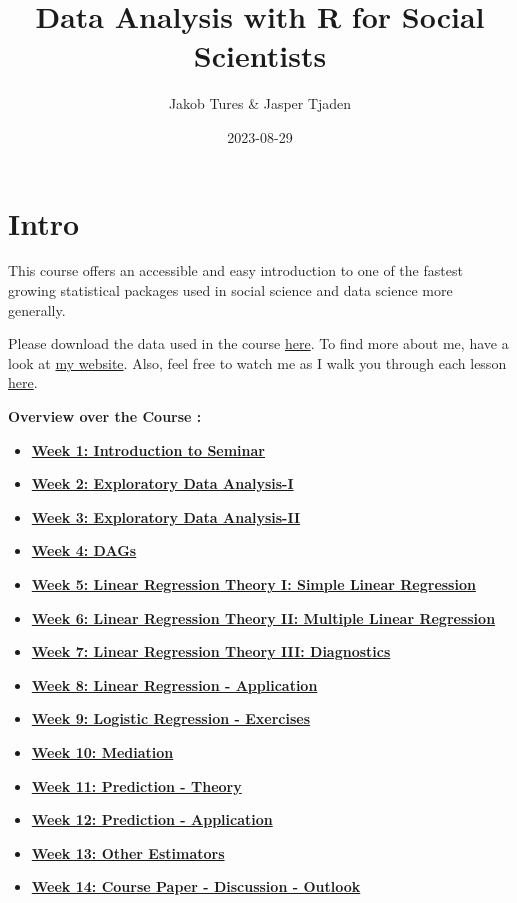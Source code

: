 \documentclass[
]{book}
\title{Data Analysis with R for Social Scientists}
\author{Jakob Tures \& Jasper Tjaden}
\date{2023-08-29}
\providecommand{\tightlist}{%
  \setlength{\itemsep}{0pt}\setlength{\parskip}{0pt}}
\begin{document}
\maketitle

{
\setcounter{tocdepth}{1}
\tableofcontents
}
\hypertarget{intro}{%
\chapter*{Intro}\label{intro}}

This course offers an accessible and easy introduction to one of the fastest growing statistical packages used in social science and data science more generally.

Please download the data used in the course \href{https://www.worldvaluessurvey.org/WVSDocumentationWV7.jsp}{here}. To find more about me, have a look at \href{https://jaspertjaden.com}{my website}. Also, feel free to watch me as I walk you through each lesson \href{https://www.youtube.com/playlist?list=PLr43hk2e3hFMg4tZdJsN0qzG5YkQB3A1c}{here}.

\textbf{Overview over the Course :}

\begin{itemize}
\tightlist
\item
  \textbf{\protect\hyperlink{intro-sem}{Week 1: Introduction to Seminar}}
\item
  \textbf{\protect\hyperlink{eda-1}{Week 2: Exploratory Data Analysis-I}}
\item
  \textbf{\protect\hyperlink{eda-2}{Week 3: Exploratory Data Analysis-II}}
\item
  \textbf{\protect\hyperlink{dags-1}{Week 4: DAGs}}
\item
  \textbf{\protect\hyperlink{lin-t-1}{Week 5: Linear Regression Theory I: Simple Linear Regression}}
\item
  \textbf{\protect\hyperlink{lin-t-2}{Week 6: Linear Regression Theory II: Multiple Linear Regression}}
\item
  \textbf{\protect\hyperlink{lin-t-3}{Week 7: Linear Regression Theory III: Diagnostics}}
\item
  \textbf{\protect\hyperlink{lin-a}{Week 8: Linear Regression - Application}}
\item
  \textbf{\protect\hyperlink{lin-e}{Week 9: Logistic Regression - Exercises}}
\item
  \textbf{\protect\hyperlink{med}{Week 10: Mediation}}
\item
  \textbf{\protect\hyperlink{pm-t}{Week 11: Prediction - Theory}}
\item
  \textbf{\protect\hyperlink{pm-a}{Week 12: Prediction - Application}}
\item
  \textbf{\protect\hyperlink{other-est}{Week 13: Other Estimators}}
\item
  \textbf{\protect\hyperlink{out-look}{Week 14: Course Paper - Discussion - Outlook}}
\end{itemize}
\end{document}
